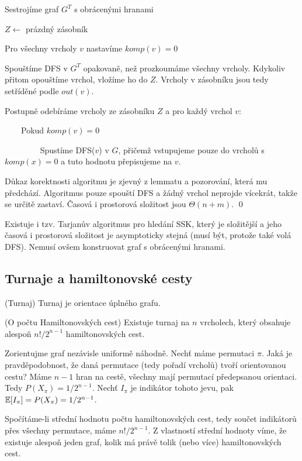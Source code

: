 \begin{enumerate*}
\item Sestrojíme graf $G^T$ s obrácenými hranami
\item $Z \leftarrow$ prázdný zásobník
\item Pro všechny vrcholy $v$ nastavíme $komp(v) = 0$
\item Spouštíme DFS v $G^T$ opakovaně, než prozkoumáme všechny vrcholy. Kdykoliv přitom opouštíme vrchol, vložíme ho do $Z$. Vrcholy v zásobníku jsou tedy setříděné podle $out(v)$.
\item Postupně odebíráme vrcholy ze zásobníku $Z$ a pro každý vrchol $v$:
\item $\qquad$Pokud $komp(v) = 0$
\leftmargin=6cm
\indent
\item $\qquad\qquad$ Spustíme DFS($v$) v $G$, přičemž vstupujeme pouze do vrcholů s $komp(x) = 0$ a tuto hodnotu přepisujeme na $v$.
\end{enumerate*}

\dk Důkaz korektnosti algoritmu je zjevný z lemmatu a pozorování, která mu předchází. Algoritmus pouze spouští DFS a žádný vrchol neprojde vícekrát, takže se určitě zastaví. Časová i prostorová složitost jsou $\Theta(n+m)$.
\qed

Existuje i tzv. Tarjanův algoritmus pro hledání SSK, který je složitější a jeho časová i prostorová složitost je asymptoticky stejná (musí být, protože také volá DFS). Nemusí ovšem konstruovat graf s obrácenými hranami.

\subsection{Turnaje a hamiltonovské cesty}

\df (Turnaj) Turnaj je orientace úplného grafu.

\vt (O počtu Hamiltonovských cest) Existuje turnaj na $n$ vrcholech, který 
obsahuje alespoň $n!/2^{n-1}$ hamiltonovských cest.

\dk Zorientujme graf nezávisle uniformě náhodně. Nechť máme permutaci $\pi$.  
Jaká je pravděpodobnost, že daná permutace (tedy pořadí vrcholů) tvoří 
orientovanou cestu? Máme $n-1$ hran na cestě, všechny mají permutací 
předepsanou orientaci. Tedy $P(X_\pi)= 1/2^{n-1}$. Nechť $I_\pi$ je indikátor 
tohoto jevu, pak $\mathbb{E}[I_\pi] = P(X_\pi) = 1/2^{n-1}$.

Spočítáme-li střední hodnotu počtu hamiltonovských cest, tedy součet indikátorů 
přes všechny permutace, máme $n!/2^{n-1}$. Z vlastností střední hodnoty víme, 
že existuje alespoň jeden graf, kolik má právě tolik (nebo více) 
hamiltonovských cest.

